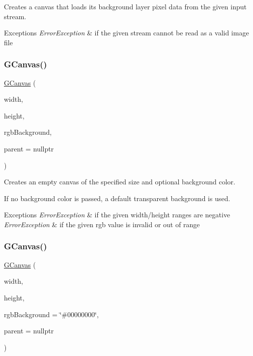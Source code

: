 Creates a canvas that loads its background layer pixel data from the given input stream. 


\begin{DoxyExceptions}{Exceptions}
{\em Error\+Exception} & if the given stream cannot be read as a valid image file \\
\hline
\end{DoxyExceptions}
\mbox{\label{classsgl_1_1GCanvas_a235f6b1b700354d6737607562df06581}} 
\subsubsection{\texorpdfstring{G\+Canvas()}{GCanvas()}\hspace{0.1cm}{\footnotesize\ttfamily [4/5]}}
{\footnotesize\ttfamily \mbox{\hyperlink{classsgl_1_1GCanvas}{G\+Canvas}} (\begin{DoxyParamCaption}\item[{double}]{width,  }\item[{double}]{height,  }\item[{int}]{rgb\+Background,  }\item[{Q\+Widget $\ast$}]{parent = {\ttfamily nullptr} }\end{DoxyParamCaption})}



Creates an empty canvas of the specified size and optional background color. 

If no background color is passed, a default transparent background is used. 
\begin{DoxyExceptions}{Exceptions}
{\em Error\+Exception} & if the given width/height ranges are negative \\
\hline
{\em Error\+Exception} & if the given rgb value is invalid or out of range \\
\hline
\end{DoxyExceptions}
\mbox{\label{classsgl_1_1GCanvas_af8bb8bd29201bbb5d0f90016a1d8df2c}} 
\subsubsection{\texorpdfstring{G\+Canvas()}{GCanvas()}\hspace{0.1cm}{\footnotesize\ttfamily [5/5]}}
{\footnotesize\ttfamily \mbox{\hyperlink{classsgl_1_1GCanvas}{G\+Canvas}} (\begin{DoxyParamCaption}\item[{double}]{width,  }\item[{double}]{height,  }\item[{const std\+::string \&}]{rgb\+Background = {\ttfamily \char`\"{}\#00000000\char`\"{}},  }\item[{Q\+Widget $\ast$}]{parent = {\ttfamily nullptr} }\end{DoxyParamCaption})}



